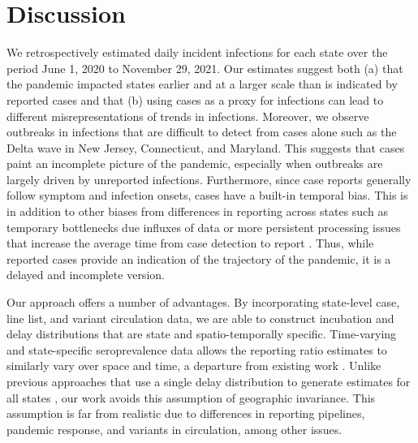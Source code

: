 \section{Discussion}

We retrospectively estimated daily incident infections for each \US state over
the period June 1, 2020 to November 29, 2021. Our estimates suggest both (a)
that the pandemic impacted states earlier and at a larger scale than is
indicated by reported cases and that (b) using cases as a proxy for infections 
can lead to different misrepresentations of trends in infections. Moreover, we observe
outbreaks in infections that are difficult to detect from cases alone such as
the Delta wave in New Jersey, Connecticut, and Maryland. This suggests that
cases paint an incomplete picture of the pandemic, especially when outbreaks are
largely driven by unreported infections. Furthermore, since case reports
generally follow symptom and infection onsets, cases have a built-in temporal
bias. This is in addition to other biases from differences in reporting across
states such as temporary bottlenecks due influxes of data or more persistent
processing issues that increase the average time from case detection to report
\citep{wash2020dash, dunkel2020covid19}. Thus, while reported cases provide an
indication of the trajectory of the pandemic, it is a delayed and incomplete
version.

Our approach offers a number of advantages. By incorporating 
state-level case, line list, and variant circulation data, we are able to construct 
incubation and delay distributions that are state and spatio-temporally specific.
Time-varying and state-specific seroprevalence data allows the reporting ratio
estimates to similarly vary over space and time, a departure from existing work
\citep{unwin2020state, uga2020covid19}. Unlike previous approaches that use
a single delay distribution to generate estimates 
for all states \citep{chitwood2022reconstructing,
jahja2022real}, our work avoids this assumption of geographic
invariance. This assumption is far from realistic due to
differences in reporting pipelines, pandemic response, and variants in
circulation, among other issues. 

